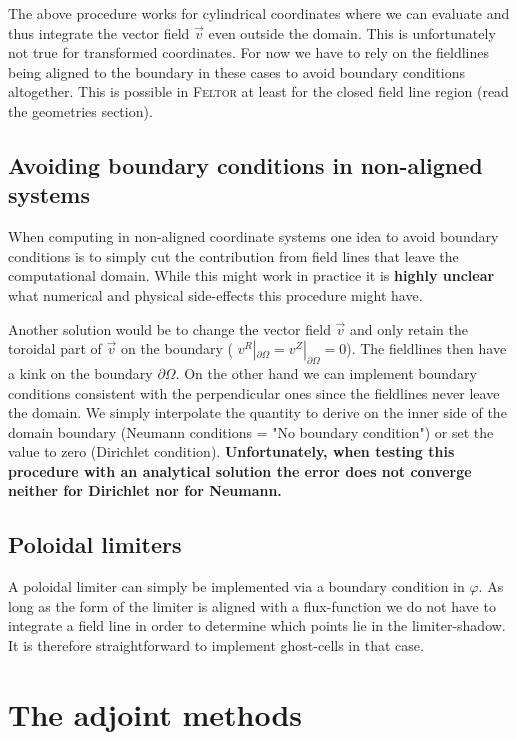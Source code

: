 The above procedure works for cylindrical coordinates where we can
evaluate and thus integrate the vector field $\vec v$ even outside the domain.
This is unfortunately not true for transformed coordinates.
For now we have to rely on the fieldlines being aligned to the
boundary in these cases to avoid boundary conditions altogether.
This is possible in \textsc{Feltor} at least for the closed field line region
(read the geometries section).

\subsection{Avoiding boundary conditions in non-aligned systems} \label{sec:avoid}

When computing in non-aligned coordinate systems
one idea to avoid boundary conditions
is to simply cut the contribution from field lines
that leave the computational domain. While this might work in practice
it is \textbf{highly unclear} what numerical and physical side-effects this procedure might have.

Another solution would be to change the
vector field $\vec v$ and only retain the toroidal part of $\vec v$ on the
boundary ( $v^R|_{\partial\Omega} = v^Z|_{\partial\Omega} =0$). The fieldlines then have a kink on the boundary $\partial\Omega$.
On the other hand we can implement boundary conditions consistent with
the perpendicular ones since the fieldlines never leave the domain.
We simply interpolate the quantity to derive on the inner side of the
domain boundary (Neumann conditions = "No boundary condition") or
set the value to zero (Dirichlet condition).
\textbf{Unfortunately, when testing this procedure with an analytical solution
the error does not converge neither for Dirichlet nor for Neumann.}

\subsection{Poloidal limiters}
A poloidal limiter can simply be implemented via a boundary condition in $\varphi$.
As long as the form of the limiter is aligned with a flux-function we do not have to
integrate a field line in order to determine which points lie in the
limiter-shadow. It is therefore straightforward to implement ghost-cells
in that case.


\section{The adjoint methods}
